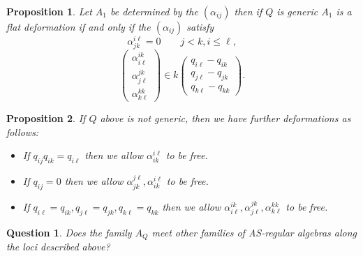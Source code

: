 \documentclass[12]{article}
\newtheorem{proposition}{Proposition}
\newtheorem{question}{Question}
\begin{document}
\begin{proposition}
  Let $A_1$ be determined by the $(\alpha_{ij})$ then if $Q$ is generic $A_1$ is a flat deformation if and only if the $(\alpha_{ij})$ satisfy
  $$ \alpha_{jk}^{i\ell} = 0 \quad \quad j < k, i \leq \ell,$$
$$\begin{pmatrix}
  \alpha^{ik}_{i\ell} \\ \alpha^{jk}_{j\ell} \\  \alpha^{kk}_{k\ell}
\end{pmatrix}
\in k
\begin{pmatrix}
  q_{i\ell} - q_{ik} \\ q_{j\ell} - q_{jk} \\ q_{k\ell} - q_{kk}
\end{pmatrix}.$$
\end{proposition}

\begin{proposition}
  If $Q$ above is not generic, then we have further deformations as follows:
  \begin{itemize}
    \item If $q_{ij}q_{ik} = q_{i\ell}$ then we allow $\alpha_{ik}^{i\ell} $ to be free.
    \item If $q_{ij} = 0$ then we allow $\alpha_{jk}^{j\ell}, \alpha_{ik}^{i\ell}$ to be free.
    \item If $q_{i\ell} = q_{ik},q_{j\ell} = q_{jk}, q_{k\ell} = q_{kk}$
      then we allow $\alpha^{ik}_{i\ell} , \alpha^{jk}_{j\ell} ,  \alpha^{kk}_{k\ell}$ to be free.
      \end{itemize}
\end{proposition}

\begin{question}
  Does the family $A_Q$ meet other families of AS-regular algebras along the loci described above?
  \end{question}
\end{document}
